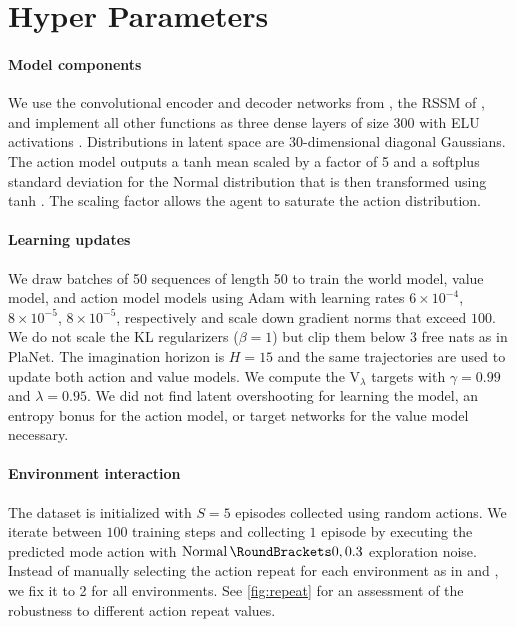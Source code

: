 \section{Hyper Parameters}
\label{sec:hparams}

\paragraph{Model components}

We use the convolutional encoder and decoder networks from \citet{ha2018worldmodels}, the RSSM of \citet{hafner2018planet}, and implement all other functions as three dense layers of size $300$ with ELU activations \citep{clevert2015elu}. Distributions in latent space are 30-dimensional diagonal Gaussians. The action model outputs a tanh mean scaled by a factor of 5 and a softplus standard deviation for the Normal distribution that is then transformed using tanh \citep{haarnoja2018sac}. The scaling factor allows the agent to saturate the action distribution.

\paragraph{Learning updates}

We draw batches of 50 sequences of length 50 to train the world model, value model, and action model models using Adam \citep{kingma2014adam} with learning rates $6\times10^{-4}$, $8\times10^{-5}$, $8\times10^{-5}$, respectively and scale down gradient norms that exceed $100$. We do not scale the KL regularizers ($\beta=1$) but clip them below $3$ free nats as in PlaNet. The imagination horizon is $H=15$ and the same trajectories are used to update both action and value models. We compute the $\mathrm{V}_\lambda$ targets with $\gamma=0.99$ and $\lambda=0.95$. We did not find latent overshooting for learning the model, an entropy bonus for the action model, or target networks for the value model necessary.

\paragraph{Environment interaction}

The dataset is initialized with $S=5$ episodes collected using random actions. We iterate between $100$ training steps and collecting $1$ episode by executing the predicted mode action with $\Normal(0,0.3)$ exploration noise. Instead of manually selecting the action repeat for each environment as in \citet{hafner2018planet} and \citet{lee2019slac}, we fix it to 2 for all environments. See \cref{fig:repeat} for an assessment of the robustness to different action repeat values.

